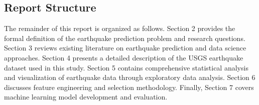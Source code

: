 \subsection{Report Structure}

The remainder of this report is organized as follows. Section 2 provides the formal definition of the earthquake prediction problem and research questions. Section 3 reviews existing literature on earthquake prediction and data science approaches. Section 4 presents a detailed description of the USGS earthquake dataset used in this study. Section 5 contains comprehensive statistical analysis and visualization of earthquake data through exploratory data analysis. Section 6 discusses feature engineering and selection methodology. Finally, Section 7 covers machine learning model development and evaluation.
